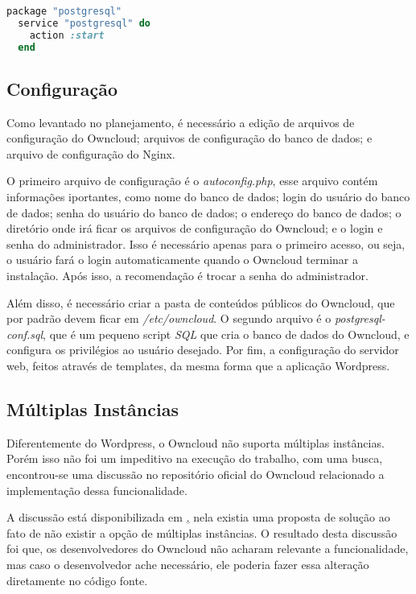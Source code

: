 \begin{lstlisting}[language=Ruby,label=dice_index,caption={Exemplo de como habilitar serviço do postgresql com chef}]
  package "postgresql"
  service "postgresql" do
    action :start
  end
\end{lstlisting}

\subsection{Configuração}

Como levantado no planejamento, é necessário a edição de arquivos de configuração
do Owncloud; arquivos de configuração do banco de dados; e arquivo de configuração
do Nginx.

O primeiro arquivo de configuração é o \textit{autoconfig.php}, esse arquivo
contém informações iportantes, como nome do banco de dados;
login do usuário do banco de dados; senha do usuário do banco de dados; o endereço 
do banco de dados; o diretório
onde irá ficar os arquivos de configuração do Owncloud; e o login e senha
do administrador. Isso é necessário apenas para o primeiro acesso, ou seja, o usuário
fará o login automaticamente quando o Owncloud terminar a instalação. Após isso,
a recomendação é trocar a senha do administrador.

Além disso, é necessário criar a pasta de conteúdos públicos do Owncloud, que por
padrão devem ficar em \textit{/etc/owncloud}. O segundo arquivo é o 
\textit{postgresql-conf.sql}, que é um pequeno script \textit{SQL} que cria o 
banco de dados do Owncloud, e configura os
privilégios ao usuário desejado. Por fim, a configuração do servidor web, feitos
através de templates, da mesma forma que a aplicação Wordpress.

\subsection{Múltiplas Instâncias}

Diferentemente do Wordpress, o Owncloud não suporta múltiplas instâncias. Porém isso
não foi um impeditivo na execução do trabalho, com uma busca, encontrou-se uma 
discussão no repositório oficial do Owncloud relacionado a implementação dessa 
funcionalidade. 

A discussão está disponibilizada em 
\href{https://github.com/owncloud/core/pull/16424}, nela existia
uma proposta de solução ao fato de não existir a opção de múltiplas instâncias. O
resultado desta discussão foi que, os desenvolvedores do Owncloud não acharam relevante
a funcionalidade, mas caso o desenvolvedor ache necessário, ele poderia fazer essa
alteração diretamente no código fonte.

